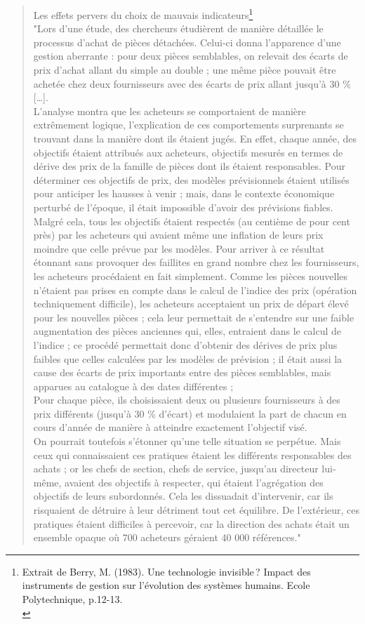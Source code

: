 \documentclass{tufte-handout}
\begin{document}
\begin{enumerate}
\begin{verse}
Les effets pervers du choix de mauvais indicateurs\footnote{Extrait de Berry, M. (1983). Une technologie invisible ? Impact des instruments de gestion sur l’évolution des systèmes humains. Ecole Polytechnique, p.12-13.\\}\\
"Lors d’une étude, des chercheurs étudièrent de manière détaillée le processus d’achat de pièces détachées. Celui-ci donna l'apparence d'une gestion aberrante : pour deux pièces semblables, on relevait des écarts de prix d'achat allant du simple au double ; une même pièce pouvait être achetée chez deux fournisseurs avec des écarts de prix allant jusqu'à 30 \% […].\\
L'analyse montra que les acheteurs se comportaient de manière extrêmement logique, l'explication de ces comportements surprenants se trouvant dans la manière dont ils étaient jugés. En effet, chaque année, des objectifs étaient attribués aux acheteurs, objectifs mesurés en termes de dérive des prix de la famille de pièces dont ils étaient responsables. Pour déterminer ces objectifs de prix, des modèles prévisionnels étaient utilisés pour anticiper les hausses à venir ; mais, dans le contexte économique perturbé de l'époque, il était impossible d'avoir des prévisions fiables. Malgré cela, tous les objectifs étaient respectés (au centième de pour cent près) par les acheteurs qui avaient même une inflation de leurs prix moindre que celle prévue par les modèles. Pour arriver à ce résultat étonnant sans provoquer des faillites en grand nombre chez les fournisseurs, les acheteurs procédaient en fait simplement. Comme les pièces nouvelles n'étaient pas prises en compte dans le calcul de l'indice des prix (opération techniquement difficile), les acheteurs acceptaient un prix de départ élevé pour les nouvelles pièces ; cela leur permettait de s'entendre sur une faible augmentation des pièces anciennes qui, elles, entraient dans le calcul de l'indice ; ce procédé permettait donc d'obtenir des dérives de prix plus faibles que celles calculées par les modèles de prévision ; il était aussi la cause des écarts de prix importants entre des pièces semblables, mais apparues au catalogue à des dates différentes ;\\
Pour chaque pièce, ils choisissaient deux ou plusieurs fournisseurs à des prix différents (jusqu'à 30 \% d'écart) et modulaient la part de chacun en cours d'année de manière à atteindre exactement l'objectif visé.\\
On pourrait toutefois s'étonner qu'une telle situation se perpétue. Mais ceux qui connaissaient ces pratiques étaient les différents responsables des achats ; or les chefs de section, chefs de service, jusqu'au directeur lui-même, avaient des objectifs à respecter, qui étaient l'agrégation des objectifs de leurs subordonnés. Cela les dissuadait d'intervenir, car ils risquaient de détruire à leur détriment tout cet équilibre. De l'extérieur, ces pratiques étaient difficiles à percevoir, car la direction des achats était un ensemble opaque où 700 acheteurs géraient 40 000 références."\\
\end{verse}


\end{enumerate}
\end{document}
